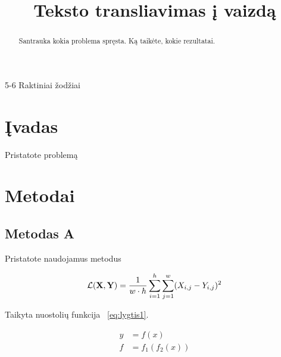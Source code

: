 \documentclass[conference]{IEEEtran}
\begin{document}
\title{Teksto transliavimas į vaizdą}
\author{
\and
{}
}
\maketitle

\begin{abstract}
Santrauka kokia problema spręsta. Ką taikėte, kokie rezultatai. 
\end{abstract}

\begin{IEEEkeywords}
5-6 Raktiniai žodžiai
\end{IEEEkeywords}

\section{Įvadas}
Pristatote problemą

\section{Metodai}

\subsection{Metodas A}

Pristatote naudojamus metodus

\begin{equation}
\mathcal{L}({\bf X}, {\bf Y}) = \frac{1}{w \cdot h} \sum_{i=1}^h \sum_{j=1}^w (X_{i, j} - Y_{i, j})^2
\label{eq:lygtis1}
\end{equation}

Taikyta nuostolių funkcija ~\eqref{eq:lygtis1}.

\begin{align}
y & = f(x) \nonumber \\
f & = f_1(f_2(x))
\label{eq:lygtis2}
\end{align}
\end{document}
